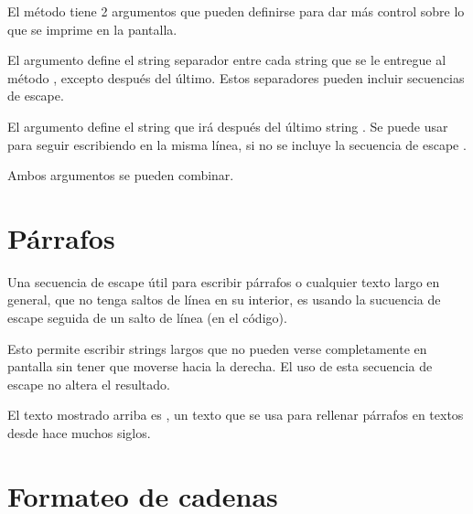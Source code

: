 
El método  tiene 2 argumentos que pueden definirse para dar más control sobre lo que se imprime en la pantalla.

El argumento  define el string separador entre cada string  que se le entregue al método , excepto después del último.
Estos separadores pueden incluir secuencias de escape.


El argumento  define el string que irá después del último string .
Se puede usar para seguir escribiendo en la misma línea, si no se incluye la secuencia de escape .


Ambos argumentos se pueden combinar.


\section{Párrafos}

Una secuencia de escape útil para escribir párrafos o cualquier texto largo en general, que no tenga saltos de línea en su interior, es usando la sucuencia de escape \ttt{\textbackslash} seguida de un salto de línea (en el código).

Esto permite escribir strings largos que no pueden verse completamente en pantalla sin tener que moverse hacia la derecha.
El uso de esta secuencia de escape no altera el resultado.


El texto mostrado arriba es , un texto que se usa para rellenar párrafos en textos desde hace muchos siglos.

\section{Formateo de cadenas}

